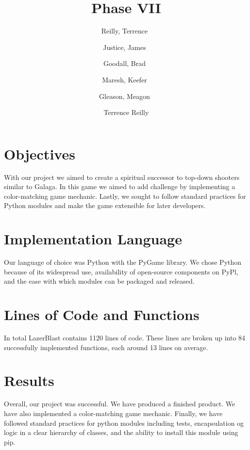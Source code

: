 \documentclass[a4paper,12pt]{article}
\author{%
    Reilly, Terrence\
    \and
    Justice, James\
    \and
    Goodall, Brad\
    \and
    Maresh, Keefer\
    \and
    Gleason, Meagon\
}
\author{Terrence Reilly}
\title{Phase VII}
\begin{document}
    \maketitle

    \section*{Objectives}
With our project we aimed to create a spiritual successor to top-down shooters
similar to Galaga. In this game we aimed to add challenge by implementing a
color-matching game mechanic. Lastly, we sought to follow standard practices for
Python modules and make the game extensible for later developers.

    \section*{Implementation Language}
Our language of choice was Python with the PyGame library. We chose Python because
of its widespread use, availability of open-source components on PyPl, and the
ease with which modules can be packaged and released.

    \section*{Lines of Code and Functions}
In total LazerBlast contains 1120 lines of code. These lines are broken up into
84 successfully implemented functions, each around 13 lines on average.

    \section*{Results}
Overall, our project was successful. We have produced a finished product.
We have also implemented a color-matching game mechanic. Finally, we have
followed standard practices for python modules including tests, encapsulation
og logic in a clear hierarchy of classes, and the ability to install this module
using pip.
\end{document}
